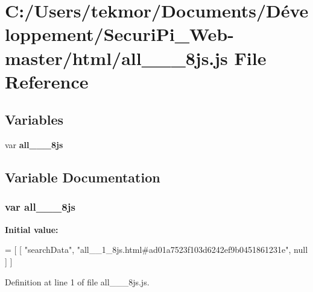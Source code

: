 \section{C\+:/\+Users/tekmor/\+Documents/\+Développement/\+Securi\+Pi\+\_\+\+Web-\/master/html/all\+\_\+\+\_\+\_\+8js.js File Reference}
\label{all____1__8js_8js}
\subsection*{Variables}
\begin{DoxyCompactItemize}
\item 
var {\bf all\+\_\+\+\_\+\_\+8js}
\end{DoxyCompactItemize}


\subsection{Variable Documentation}
\subsubsection[{all\+\_\+\+\_\+1\+\_\+8js}]{\setlength{\rightskip}{0pt plus 5cm}var all\+\_\+\+\_\+\_\+8js}\label{all____1__8js_8js_abdfd438300f0df3db46e69e263ae5a12}
{\bfseries Initial value\+:}
\begin{DoxyCode}
=
[
    [ \textcolor{stringliteral}{"searchData"}, \textcolor{stringliteral}{"all\_\_1\_8js.html#ad01a7523f103d6242ef9b0451861231e"}, null ]
]
\end{DoxyCode}


Definition at line 1 of file all\+\_\+\+\_\+\_\+8js.\+js.

